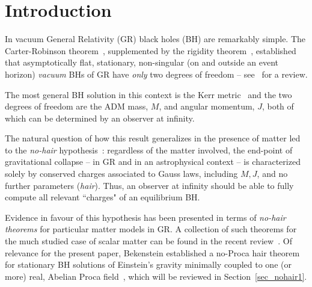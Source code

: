 \documentclass{article}
\numberwithin{equation}{section}
\begin{document}



 
 \newpage

\section{Introduction}
 
In vacuum General Relativity (GR) black holes (BH) are remarkably simple. The Carter-Robinson theorem~\cite{Carter:1971zc,Robinson:1975bv}, supplemented by the rigidity theorem~\cite{Hawking:1971vc,Racz:1995nh}, established that asymptotically flat, stationary, non-singular (on and outside an event horizon)  \textit{vacuum} BHs of GR have \textit{only} 
two degrees of freedom -- see~\cite{Chrusciel:2012jk} for a review.  

The most general BH solution in this context is the Kerr metric~\cite{Kerr:1963ud} and the two degrees of freedom are the ADM mass, $M$, and angular momentum, $J$, both of which can be determined by an observer at infinity. 

The natural question of how this result generalizes in the presence of matter led to the \textit{no-hair} hypothesis~\cite{Ruffini:1971bza}: regardless of the matter involved, the end-point of gravitational collapse -- in GR and in an astrophysical context -- is characterized solely by conserved charges associated to Gauss laws, including $M,J$, and no further parameters (\textit{hair}). Thus, an observer at infinity should be able to fully compute all relevant ``charges" of an equilibrium BH.

Evidence in favour of this hypothesis has been presented in terms of \textit{no-hair theorems} for particular matter models in GR. A collection of such theorems for the much studied case of scalar matter can be found in the recent review~\cite{Herdeiro:2015waa}. Of relevance for the present paper, Bekenstein established a no-Proca hair theorem for stationary BH solutions of Einstein's gravity minimally coupled to one (or more) real, Abelian Proca field~\cite{Bekenstein:1971hc,Bekenstein:1972ky}, which will be reviewed in Section~\ref{sec_nohair1}. 
\end{document}
